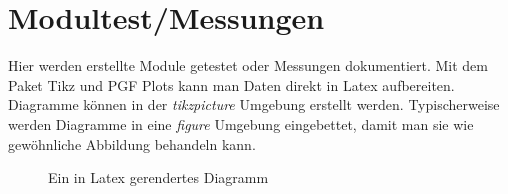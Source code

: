 

\section{Modultest/Messungen}

Hier werden erstellte Module getestet oder Messungen dokumentiert. Mit dem Paket Tikz und PGF Plots kann man Daten direkt in Latex aufbereiten. Diagramme können in der \emph{tikzpicture} Umgebung erstellt werden. Typischerweise werden Diagramme in eine \emph{figure} Umgebung eingebettet, damit man sie wie gewöhnliche Abbildung behandeln kann.

\begin{figure}[htbp]
	\centering
	
	
	\caption{Ein in Latex gerendertes Diagramm}
	\label{pic:LatexDiagramm}
\end{figure}


